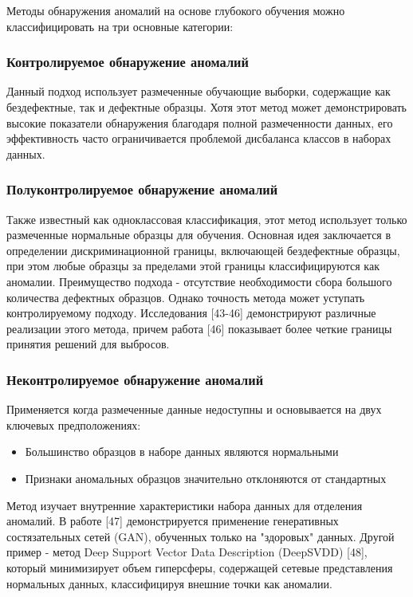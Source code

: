 \documentclass[14pt,a4paper]{article}
\begin{document}
Методы обнаружения аномалий на основе глубокого обучения можно классифицировать на три основные категории:

\subsubsection{Контролируемое обнаружение аномалий}
Данный подход использует размеченные обучающие выборки, содержащие как бездефектные, так и дефектные образцы. Хотя этот метод может демонстрировать высокие показатели обнаружения благодаря полной размеченности данных, его эффективность часто ограничивается проблемой дисбаланса классов в наборах данных.

\subsubsection{Полуконтролируемое обнаружение аномалий}
Также известный как одноклассовая классификация, этот метод использует только размеченные нормальные образцы для обучения. Основная идея заключается в определении дискриминационной границы, включающей бездефектные образцы, при этом любые образцы за пределами этой границы классифицируются как аномалии. Преимущество подхода - отсутствие необходимости сбора большого количества дефектных образцов. Однако точность метода может уступать контролируемому подходу. Исследования [43-46] демонстрируют различные реализации этого метода, причем работа [46] показывает более четкие границы принятия решений для выбросов.

\subsubsection{Неконтролируемое обнаружение аномалий}
Применяется когда размеченные данные недоступны и основывается на двух ключевых предположениях:
\begin{itemize}
	\item Большинство образцов в наборе данных являются нормальными
	\item Признаки аномальных образцов значительно отклоняются от стандартных
\end{itemize}

Метод изучает внутренние характеристики набора данных для отделения аномалий. В работе [47] демонстрируется применение генеративных состязательных сетей (GAN), обученных только на "здоровых" данных. Другой пример - метод Deep Support Vector Data Description (DeepSVDD) [48], который минимизирует объем гиперсферы, содержащей сетевые представления нормальных данных, классифицируя внешние точки как аномалии.
\end{document}
